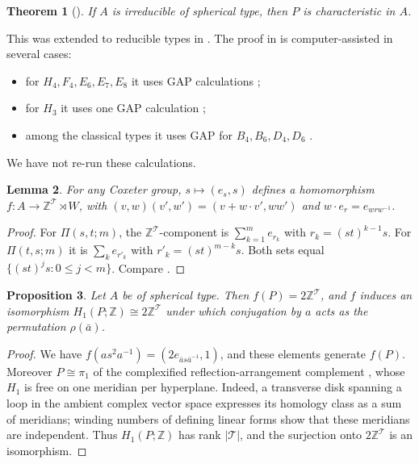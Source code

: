 \documentclass[11pt]{amsart}
\newtheorem{theorem}{Theorem}[section]
\newtheorem{lemma}[theorem]{Lemma}
\newtheorem{proposition}[theorem]{Proposition}
\theoremstyle{definition}
\newcommand{\Z}{\mathbb{Z}}
\newcommand{\T}{\mathcal{T}}
\begin{document}
\begin{theorem}[{\cite[Thm.~1.4]{CP03}}]\label{thm:char}
If $A$ is irreducible of spherical type, then $P$ is characteristic in $A$.
\end{theorem}

This was extended to reducible types in \cite{FP06}. The proof in \cite{CP03} is computer-assisted in several
cases:
\begin{itemize}
\item for $H_4,F_4,E_6,E_7,E_8$ it uses GAP calculations \cite[Prop.~5.4, Cor.~5.5]{CP03};
\item for $H_3$ it uses one GAP calculation \cite[Lemma~5.1]{CP03};
\item among the classical types it uses GAP for $B_4,B_6,D_4,D_6$ \cite[Lemmas~3.5, 4.4]{CP03}.
\end{itemize}
We have not re-run these calculations.

\begin{lemma}\label{lem:f}
For any Coxeter group, $s\mapsto(e_s,s)$ defines a homomorphism $f\colon A\to\Z^\T\rtimes W$, with
$(v,w)(v',w')=(v+w\cdot v',ww')$ and $w\cdot e_r=e_{wrw^{-1}}$.
\end{lemma}
\begin{proof}
For $\Pi(s,t;m)$, the $\Z^\T$-component is $\sum_{k=1}^me_{r_k}$ with $r_k=(st)^{k-1}s$. For $\Pi(t,s;m)$ it is
$\sum_ke_{r'_k}$ with $r'_k=(st)^{m-k}s$. Both sets equal $\{(st)^js:0\le j<m\}$. Compare \cite[Lemma~3.7]{CP03}.
\end{proof}

\begin{proposition}\label{prop:H1}
Let $A$ be of spherical type. Then $f(P)=2\Z^\T$, and $f$ induces an isomorphism $H_1(P;\Z)\cong2\Z^\T$ under which
conjugation by $a$ acts as the permutation $\rho(\bar a)$.
\end{proposition}
\begin{proof}
We have $f(as^2a^{-1})=(2e_{\bar as\bar a^{-1}},1)$, and these elements generate $f(P)$. Moreover $P\cong\pi_1$ of
the complexified reflection-arrangement complement \cite{Bri71}, whose $H_1$ is free on one meridian per hyperplane. Indeed, a transverse disk spanning a loop
in the ambient complex vector space expresses its homology class as a sum of meridians;
winding numbers of defining linear forms show that these meridians are independent.
Thus $H_1(P;\Z)$ has rank $|\T|$, and the surjection onto $2\Z^\T$ is an isomorphism.
\end{proof}
\end{document}
